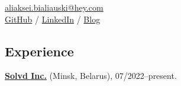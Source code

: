 \documentclass{h1alexbel}
\begin{document}
    \sffamily

    \printPhoto{}

    {\scshape\bfseries\Large {}}\newline
    \href{mailto:aliaksei.bialiauski@hey.com}{aliaksei.bialiauski@hey.com}\\
    \href{https://github.com/h1alexbel}{GitHub} /
    \href{https://www.linkedin.com/in/h1alexbel/}{LinkedIn} /
    \href{https://h1alexbel.github.io}{Blog}

    \subsection*{Experience}
    \vspace{-7pt}
    \small
    \textbf{\href{https://www.solvd.com}{Solvd Inc.}} (Minsk, Belarus), 07/2022--present.\\
\end{document}
